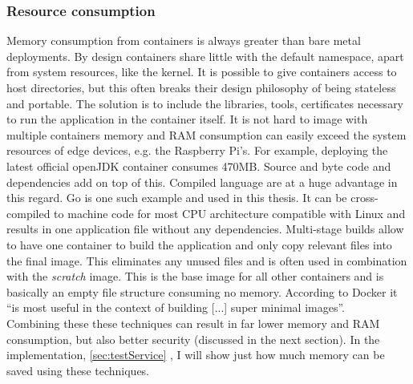 \subsubsection{Resource consumption}
Memory consumption from containers is always greater than bare metal deployments. By design containers share little with the default namespace, apart from system resources, like the kernel. It is possible to give containers access to host directories, but this often breaks their design philosophy of being stateless and portable. The solution is to include the libraries, tools, certificates necessary to run the application in the container itself. It is not hard to image with multiple containers memory and RAM consumption can easily exceed the system resources of edge devices, e.g. the Raspberry Pi’s. For example, deploying the latest official openJDK container consumes 470MB. Source and byte code and dependencies add on top of this. Compiled language are at a huge advantage in this regard. Go is one such example and used in this thesis. It can be cross-compiled to machine code for most CPU architecture compatible with Linux and results in one application file without any dependencies. Multi-stage builds allow to have one container to build the application and only copy relevant files into the final image. This eliminates any unused files and is often used in combination with the \textit{scratch} image. This is the base image for all other containers and is basically an empty file structure consuming no memory. According to Docker it ``is most useful in the context of building [...] super minimal images''\cite{scratchImageDockerD65:online}.\\
Combining these these techniques can result in far lower memory and RAM consumption, but also better security (discussed in the next section). In the implementation, \cref{sec:testService} , I will show just how much memory can be saved using these techniques. 